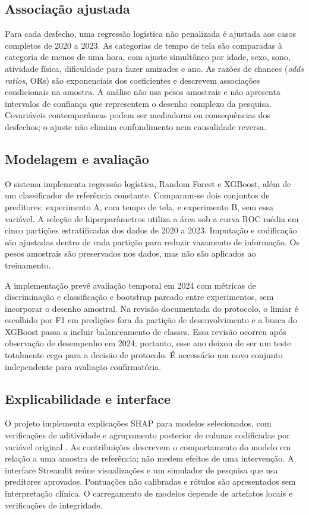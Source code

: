 \documentclass[12pt]{article}
\begin{document}
\subsection{Associação ajustada}
Para cada desfecho, uma regressão logística não penalizada é ajustada aos casos completos de 2020 a 2023. As categorias de tempo de tela são comparadas à categoria de menos de uma hora, com ajuste simultâneo por idade, sexo, sono, atividade física, dificuldade para fazer amizades e ano. As razões de chances (\textit{odds ratios}, ORs) são exponenciais dos coeficientes e descrevem associações condicionais na amostra. A análise não usa pesos amostrais e não apresenta intervalos de confiança que representem o desenho complexo da pesquisa. Covariáveis contemporâneas podem ser mediadoras ou consequências dos desfechos; o ajuste não elimina confundimento nem causalidade reversa.

\subsection{Modelagem e avaliação}
O sistema implementa regressão logística, Random Forest e XGBoost, além de um classificador de referência constante. Comparam-se dois conjuntos de preditores: experimento A, com tempo de tela, e experimento B, sem essa variável. A seleção de hiperparâmetros utiliza a área sob a curva ROC média em cinco partições estratificadas dos dados de 2020 a 2023. Imputação e codificação são ajustadas dentro de cada partição para reduzir vazamento de informação. Os pesos amostrais são preservados nos dados, mas não são aplicados ao treinamento.

A implementação prevê avaliação temporal em 2024 com métricas de discriminação e classificação e bootstrap pareado entre experimentos, sem incorporar o desenho amostral. Na revisão documentada do protocolo, o limiar é escolhido por F1 em predições fora da partição de desenvolvimento e a busca do XGBoost passa a incluir balanceamento de classes. Essa revisão ocorreu após observação de desempenho em 2024; portanto, esse ano deixou de ser um teste totalmente cego para a decisão de protocolo. É necessário um novo conjunto independente para avaliação confirmatória.

\subsection{Explicabilidade e interface}
O projeto implementa explicações SHAP para modelos selecionados, com verificações de aditividade e agrupamento posterior de colunas codificadas por variável original \cite{lundberg2017}. As contribuições descrevem o comportamento do modelo em relação a uma amostra de referência; não medem efeitos de uma intervenção. A interface Streamlit reúne visualizações e um simulador de pesquisa que usa preditores aprovados. Pontuações não calibradas e rótulos são apresentados sem interpretação clínica. O carregamento de modelos depende de artefatos locais e verificações de integridade.
\end{document}
